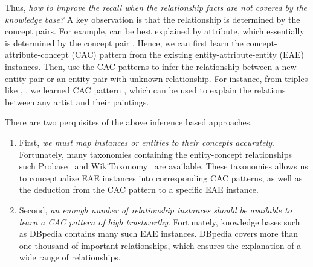 Thus, {\it how to improve the recall when the relationship facts are not covered by the knowledge base?}
A key observation is that the relationship is determined by the concept pairs. For example,  can be best explained by  attribute, which essentially is determined by the concept pair . Hence, we can first learn the concept-attribute-concept (CAC) pattern from the existing entity-attribute-entity (EAE) instances. Then, use the CAC patterns to infer the relationship between a new entity pair or an entity pair with unknown relationship.
For instance, from triples like , , we learned CAC pattern , which can be used to explain the  relations between any artist and their paintings.

There are two perquisites of the above inference based approaches.
\begin{enumerate}
\item First, {\it we must map instances or entities to their concepts accurately}. 
Fortunately, many taxonomies containing the entity-concept relationships such \ac{Probase}~\cite{wu2012probase} and \ac{WikiTaxonomy}~\cite{ponzetto2007deriving} are available. These taxonomies allows us to conceptualize EAE instances into corresponding CAC patterns, as well as the deduction from the CAC pattern to a specific EAE instance.
\item Second, {\it an enough number of relationship instances should be available to learn a CAC pattern of high trustworthy}. Fortunately, knowledge bases such as \ac{DBpedia} contains many such EAE instances. DBpedia covers more than one thousand of important relationships, which ensures the explanation of a wide range of relationships.
\end{enumerate}




